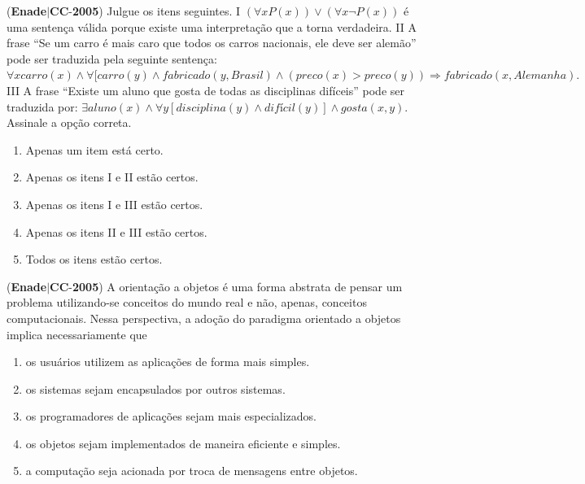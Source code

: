 \documentclass{exam}
\begin{document}
\begin{questions}
\question (\textbf{Enade}$|$\textbf{CC}-\textbf{2005}) Julgue os itens seguintes.
I $(\forall x P(x)) \vee (\forall x \neg P(x)) $ é uma sentença válida porque existe
uma interpretação que a torna verdadeira.
II A frase “Se um carro é mais caro que todos os carros
nacionais, ele deve ser alemão” pode ser traduzida pela
seguinte sentença: $\forall x carro(x) \wedge \forall [carro(y) \wedge fabricado(y,Brasil) \wedge (preco(x) > preco(y)) \Rightarrow fabricado(x, Alemanha). $
III A frase “Existe um aluno que gosta de todas as disciplinas
difíceis” pode ser traduzida por: $\exists aluno(x) \wedge \forall y [disciplina(y) \wedge difícil(y)] \wedge gosta(x, y).$
Assinale a opção correta.
	\begin{enumerate}[label=\alph*)]
		\item  Apenas um item está certo.
		\item  Apenas os itens I e II estão certos.
		\item  Apenas os itens I e III estão certos.
		\item  Apenas os itens II e III estão certos.
		\item  Todos os itens estão certos.

	\end{enumerate}

\question (\textbf{Enade}$|$\textbf{CC}-\textbf{2005}) A orientação a objetos é uma forma abstrata de pensar um
problema utilizando-se conceitos do mundo real e não, apenas,
conceitos computacionais. Nessa perspectiva, a adoção do
paradigma orientado a objetos implica necessariamente que
	\begin{enumerate}[label=\alph*)]
		\item  os usuários utilizem as aplicações de forma mais simples.
		\item  os sistemas sejam encapsulados por outros sistemas.
		\item  os programadores de aplicações sejam mais especializados.
		\item  os objetos sejam implementados de maneira eficiente e
simples.
		\item  a computação seja acionada por troca de mensagens entre
objetos.

	\end{enumerate}


\end{questions}
\end{document}
